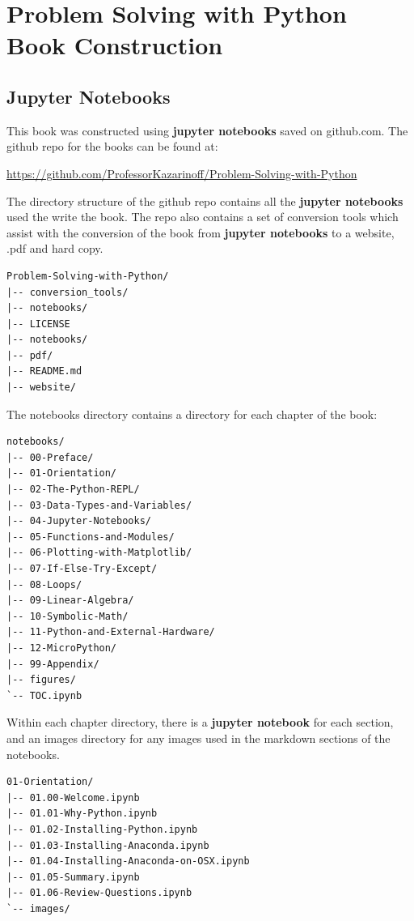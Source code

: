 \documentclass{book}
\begin{document}
    \section{Problem Solving with Python Book
Construction}\label{problem-solving-with-python-book-construction}

    \subsection{Jupyter Notebooks}\label{jupyter-notebooks}

    This book was constructed using \textbf{jupyter notebooks} saved on
github.com. The github repo for the books can be found at:

\url{https://github.com/ProfessorKazarinoff/Problem-Solving-with-Python}

    The directory structure of the github repo contains all the
\textbf{jupyter notebooks} used the write the book. The repo also
contains a set of conversion tools which assist with the conversion of
the book from \textbf{jupyter notebooks} to a website, .pdf and hard
copy.

    \begin{lstlisting}
Problem-Solving-with-Python/
|-- conversion_tools/
|-- notebooks/
|-- LICENSE
|-- notebooks/
|-- pdf/
|-- README.md
|-- website/
\end{lstlisting}

    The notebooks directory contains a directory for each chapter of the
book:

    \begin{lstlisting}
notebooks/
|-- 00-Preface/
|-- 01-Orientation/
|-- 02-The-Python-REPL/
|-- 03-Data-Types-and-Variables/
|-- 04-Jupyter-Notebooks/
|-- 05-Functions-and-Modules/
|-- 06-Plotting-with-Matplotlib/
|-- 07-If-Else-Try-Except/
|-- 08-Loops/
|-- 09-Linear-Algebra/
|-- 10-Symbolic-Math/
|-- 11-Python-and-External-Hardware/
|-- 12-MicroPython/
|-- 99-Appendix/
|-- figures/
`-- TOC.ipynb
\end{lstlisting}

    Within each chapter directory, there is a \textbf{jupyter notebook} for
each section, and an images directory for any images used in the
markdown sections of the notebooks.

\begin{lstlisting}
01-Orientation/
|-- 01.00-Welcome.ipynb
|-- 01.01-Why-Python.ipynb
|-- 01.02-Installing-Python.ipynb
|-- 01.03-Installing-Anaconda.ipynb
|-- 01.04-Installing-Anaconda-on-OSX.ipynb
|-- 01.05-Summary.ipynb
|-- 01.06-Review-Questions.ipynb
`-- images/
\end{lstlisting}
\end{document}

